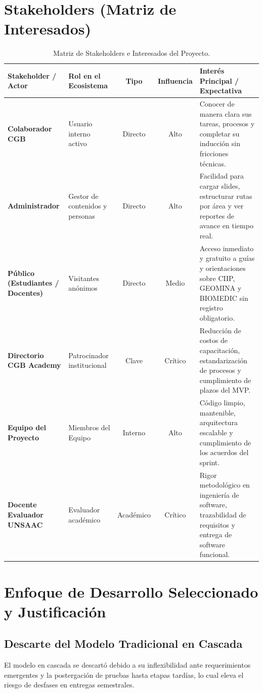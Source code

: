 \documentclass[11pt,a4paper]{article}
\begin{document}
\section{Stakeholders (Matriz de Interesados)}
\begin{table}[H]
\centering
\scriptsize
\renewcommand{\arraystretch}{1.25}
\begin{tabularx}{\linewidth}{|>{\raggedright\arraybackslash}p{2.8cm}|>{\raggedright\arraybackslash}p{3.0cm}|c|c|>{\raggedright\arraybackslash}X|}
\hline
\rowcolor{gray!15}
\textbf{Stakeholder / Actor} & \textbf{Rol en el Ecosistema} & \textbf{Tipo} & \textbf{Influencia} & \textbf{Interés Principal / Expectativa} \\
\hline
\textbf{Colaborador CGB} & Usuario interno activo & Directo & Alto & Conocer de manera clara sus tareas, procesos y completar su inducción sin fricciones técnicas. \\
\hline
\textbf{Administrador} & Gestor de contenidos y personas & Directo & Alto & Facilidad para cargar slides, estructurar rutas por área y ver reportes de avance en tiempo real. \\
\hline
\textbf{Público (Estudiantes / Docentes)} & Visitantes anónimos & Directo & Medio & Acceso inmediato y gratuito a guías y orientaciones sobre CIIP, GEOMINA y BIOMEDIC sin registro obligatorio. \\
\hline
\textbf{Directorio CGB Academy} & Patrocinador institucional & Clave & Crítico & Reducción de costos de capacitación, estandarización de procesos y cumplimiento de plazos del MVP. \\
\hline
\textbf{Equipo del Proyecto} & 5 Miembros del Equipo & Interno & Alto & Código limpio, mantenible, arquitectura escalable y cumplimiento de los acuerdos del sprint. \\
\hline
\textbf{Docente Evaluador UNSAAC} & Evaluador académico & Académico & Crítico & Rigor metodológico en ingeniería de software, trazabilidad de requisitos y entrega de software funcional. \\
\hline
\end{tabularx}
\caption{Matriz de Stakeholders e Interesados del Proyecto.}
\end{table}

\section{Enfoque de Desarrollo Seleccionado y Justificación}
\subsection{Descarte del Modelo Tradicional en Cascada}
El modelo en cascada se descartó debido a su inflexibilidad ante requerimientos emergentes y la postergación de pruebas hasta etapas tardías, lo cual eleva el riesgo de desfases en entregas semestrales.
\end{document}
